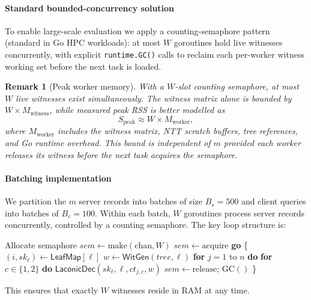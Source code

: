 \documentclass[preprint,12pt]{elsarticle}
\newtheorem{remark}{Remark}
\newcommand{\laconicdec}{\textsf{LaconicDec}}
\newcommand{\witgen}{\textsf{WitGen}}
\newcommand{\LeafMap}{\mathsf{LeafMap}}
\begin{document}
\paragraph{Standard bounded-concurrency solution}
To enable large-scale evaluation we apply a counting-semaphore pattern
(standard in Go HPC workloads): at most $W$ goroutines hold live witnesses
concurrently, with explicit \texttt{runtime.GC()} calls to reclaim each per-worker
witness working set before the next task is loaded.

\begin{remark}[Peak worker memory]
\label{thm:batch}
With a $W$-slot counting semaphore, at most $W$ live witnesses exist
simultaneously. The witness matrix alone is bounded by
$W \times M_{\text{witness}}$, while measured peak RSS is better modelled as
\[
  S_{\text{peak}} \approx W \times M_{\text{worker}},
\]
where $M_{\text{worker}}$ includes the witness matrix, NTT scratch buffers,
tree references, and Go runtime overhead. This bound is independent of $m$
provided each worker releases its witness before the next task acquires the
semaphore.
\end{remark}

\paragraph{Batching implementation}
We partition the $m$ server records into batches of size $B_s = 500$ and
client queries into batches of $B_c = 100$. Within each batch, $W$ goroutines
process server records concurrently, controlled by a counting semaphore.
The key loop structure is:
\begin{algorithmic}[1]
\STATE Allocate semaphore $\mathit{sem} \leftarrow \text{make}(\text{chan}, W)$
\FOR{each occupied leaf $\ell \in \operatorname{dom}(\LeafMap)$}
  \STATE $\mathit{sem} \leftarrow \text{acquire}$
  \STATE \textbf{go} \{
  \STATE \quad $(i, sk_\ell) \leftarrow \LeafMap[\ell]$
  \STATE \quad $w \leftarrow \witgen(\mathit{tree}, \ell)$
  \STATE \quad \textbf{for} $j = 1$ to $n$ \textbf{do}
         \textbf{for} $c \in \{1,2\}$ \textbf{do} $\laconicdec(sk_\ell, \ell, ct_{j,c}, w)$
  \STATE \quad $\mathit{sem} \leftarrow \text{release}$; $\text{GC}()$
  \STATE \}
\ENDFOR
\end{algorithmic}
This ensures that exactly $W$ witnesses reside in RAM at any time.
\end{document}
